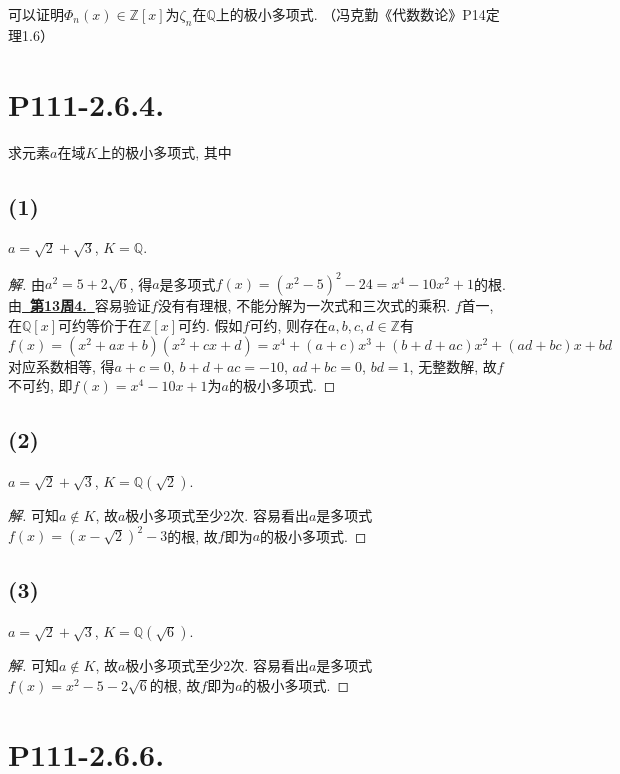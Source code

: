 \documentclass[12pt, a4paper, fontset=windows]{ctexart}
\newcommand{\Q}{\mathbb{Q}}
\newcommand{\Z}{\mathbb{Z}}
\newcommand{\kh}[1]{（{#1}）} %
\newcommand{\myref}[2][]{\hyperref[#1]{\bf\color{blue}\ {#2}\ }}
\newenvironment{solution}{\begin{proof}[解]}{\end{proof}}
\begin{document}
可以证明$\Phi_n(x)\in\Z[x]$为$\zeta_n$在$\Q$上的极小多项式. 
\cite{fkqdssl}\kh{冯克勤《代数数论》P14定理1.6}

\section*{P111-2.6.4.}

求元素$a$在域$K$上的极小多项式, 其中

\subsection*{(1)}

$a=\sqrt2+\sqrt3$, $K=\Q$. 

\begin{solution}
由$a^2=5+2\sqrt{6}$, 得$a$是多项式$f(x)=(x^2-5)^2-24=x^4-10x^2+1$的根. 
由\myref[Q-root]{第13周4.}容易验证$f$没有有理根, 不能分解为一次式和三次式的乘积. 
$f$首一, 在$\Q[x]$可约等价于在$\Z[x]$可约. 假如$f$可约, 
则存在$a,b,c,d\in\Z$有
\[f(x)=(x^2+ax+b)(x^2+cx+d)=x^4+(a+c)x^3+(b+d+ac)x^2+(ad+bc)x+bd\]
对应系数相等, 得$a+c=0$, $b+d+ac=-10$, $ad+bc=0$, $bd=1$, 
无整数解, 故$f$不可约, 即$f(x)=x^4-10x+1$为$a$的极小多项式. 
\end{solution}

\subsection*{(2)}

$a=\sqrt2+\sqrt3$, $K=\Q(\sqrt2)$. 

\begin{solution}
可知$a\notin K$, 故$a$极小多项式至少$2$次. 
容易看出$a$是多项式$f(x)=(x-\sqrt{2})^2-3$的根, 
故$f$即为$a$的极小多项式. 
\end{solution}

\subsection*{(3)}

$a=\sqrt2+\sqrt3$, $K=\Q(\sqrt6)$. 

\begin{solution}
可知$a\notin K$, 故$a$极小多项式至少$2$次. 
容易看出$a$是多项式$f(x)=x^2-5-2\sqrt{6}$的根, 
故$f$即为$a$的极小多项式. 
\end{solution}

\section*{P111-2.6.6.}
\end{document}
